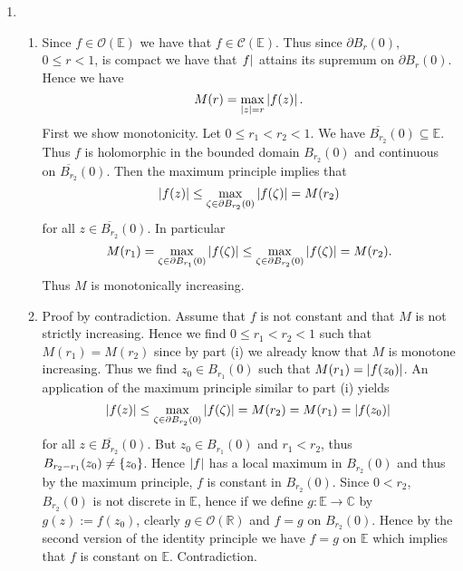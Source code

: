 \begin{enumerate}[label = \textbf{Exercise \arabic*.},wide = 0pt, itemsep=1.5ex]
	\item
		~
		\begin{enumerate}[label = (\roman*),wide = 0pt, itemsep=1.5ex]
			\item Since $f \in \mathcal{O}(\mathbb{E})$ we have that $f \in \mathscr{C}(\mathbb{E})$. Thus since $\partial B_r(0)$, $0 \leq r < 1$, is compact we have that $\abs{f}$ attains its supremum on $\partial B_r(0)$. Hence we have 
				\begin{equation}
					M(r) = \max_{\abs[0]{z} = r} \abs[0]{f(z)}.
				\end{equation}
				First we show monotonicity. Let $0 \leq r_1 < r_2 < 1$. We have $\overline{B_{r_2}}(0) \subseteq \mathbb{E}$. Thus $f$ is holomorphic in the bounded domain $B_{r_2}(0)$ and continuous on $\overline{B_{r_2}}(0)$. Then the maximum principle implies that 
				\begin{equation}
					\abs[0]{f(z)} \leq \max_{\zeta \in \partial B_{r_2}(0)}\abs[0]{f(\zeta)} = M(r_2)
				\end{equation}
				\noindent for all $z \in \overline{B_{r_2}}(0)$. In particular 
				\begin{equation}
					M(r_1) = \max_{\zeta \in \partial B_{r_1}(0)}\abs[0]{f(\zeta)} \leq \max_{\zeta \in \partial B_{r_2}(0)}\abs[0]{f(\zeta)} = M(r_2).
				\end{equation}
				Thus $M$ is monotonically increasing.
			\item Proof by contradiction. Assume that $f$ is not constant and that $M$ is not strictly increasing. Hence we find $0 \leq r_1 < r_2 < 1$ such that $M(r_1) = M(r_2)$ since by part (i) we already know that $M$ is monotone increasing. Thus we find $z_0 \in B_{r_1}(0)$ such that $M(r_1) = \abs[0]{f(z_0)}$. An application of the maximum principle similar to part (i) yields
				\begin{equation}
					\abs[0]{f(z)} \leq \max_{\zeta \in \partial B_{r_2}(0)}	\abs[0]{f(\zeta)} = M(r_2) = M(r_1) = \abs[0]{f(z_0)}
				\end{equation}
				\noindent for all $z \in \overline{B_{r_2}}(0)$. But $z_0 \in B_{r_1}(0)$ and $r_1 < r_2$, thus $B_{r_2 - r_1}(z_0) \neq \cbr[0]{z_0}$. Hence $\abs[0]{f}$ has a local maximum in $B_{r_2}(0)$ and thus by the maximum principle, $f$ is constant in $B_{r_2}(0)$. Since $0 < r_2$, $B_{r_2}(0)$ is not discrete in $\mathbb{E}$, hence if we define $g: \mathbb{E} \to \mathbb{C}$ by $g(z) := f(z_0)$, clearly $g \in \mathcal{O}(\mathbb{R})$ and $f = g$ on $B_{r_2}(0)$. Hence by the second version of the identity principle we have $f = g$ on $\mathbb{E}$ which implies that $f$ is constant on $\mathbb{E}$. Contradiction. 
		\end{enumerate}


\end{enumerate}
